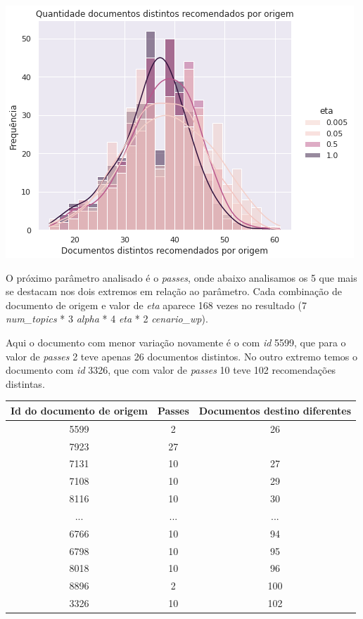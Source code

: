 \includegraphics[scale=0.7]{resultados/resources/distribuicao_semelhantes_distintos_eta.png}

O próximo parâmetro analisado é o \textit{passes}, onde abaixo analisamos os 5 que mais se destacam nos dois extremos em relação ao parâmetro.
Cada combinação de documento de origem e valor de \textit{eta} aparece 168 vezes no resultado (7 \textit{num\_topics} * 3 \textit{alpha} * 4 \textit{eta} * 2 \textit{cenario\_wp}).

Aqui o documento com menor variação novamente é o com \textit{id} 5599, que para o valor de \textit{passes} 2 teve apenas 26 documentos distintos. 
No outro extremo temos o documento com \textit{id} 3326, que com valor de \textit{passes} 10 teve 102 recomendações distintas.

\begin{center}
    \begin{tabular}{|c|c|c|}
        \hline
        Id do documento de origem & Passes & Documentos destino diferentes \\
        \hline
        5599 & 2 & 26 \\
        \hline
        7923 & 27 & \\
        \hline
        7131 & 10 & 27 \\
        \hline
        7108 & 10 & 29 \\
        \hline
        8116 & 10 & 30 \\
        \hline
        ... & ... & ... \\
        \hline
        6766 & 10 & 94 \\
        \hline
        6798 & 10 & 95 \\
        \hline
        8018 & 10 & 96 \\
        \hline
        8896 & 2 & 100 \\
        \hline
        3326 & 10 & 102 \\
        \hline
    \end{tabular}
\end{center}

